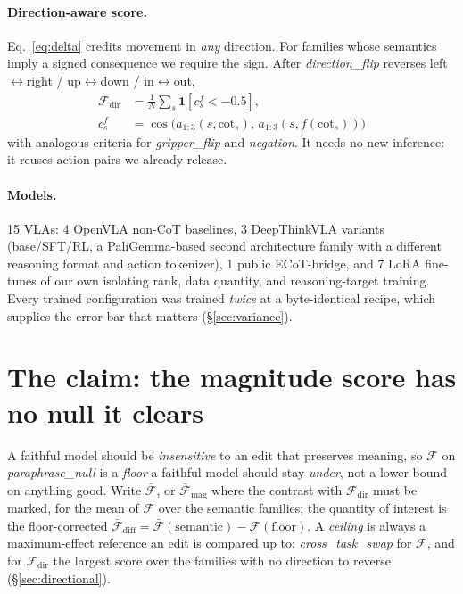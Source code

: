 \documentclass[11pt]{article}
\begin{document}
\paragraph{Direction-aware score.} Eq.~\ref{eq:delta} credits movement in \emph{any} direction. For families whose semantics imply a signed consequence we require the sign. After \emph{direction\_flip} reverses left$\leftrightarrow$right / up$\leftrightarrow$down / in$\leftrightarrow$out,
\begin{align}
\mathcal{F}_{\text{dir}} &= \tfrac{1}{N}\textstyle\sum_s \mathbf{1}\!\left[c^f_s < -0.5\right], \label{eq:fdir}\\
c^f_s &= \cos\bigl(a_{1:3}(s,\text{cot}_s),\, a_{1:3}(s,f(\text{cot}_s))\bigr) \nonumber
\end{align}
with analogous criteria for \emph{gripper\_flip} and \emph{negation}. It needs no new inference: it reuses action pairs we already release.

\paragraph{Models.} 15 VLAs: 4 OpenVLA \citep{openvla} non-CoT baselines, 3 DeepThinkVLA \citep{deepthinkvla} variants (base/SFT/RL, a PaliGemma-based \citep{paligemma} second architecture family with a different reasoning format and action tokenizer), 1 public ECoT-bridge, and 7 LoRA \citep{lora} fine-tunes of our own isolating rank, data quantity, and reasoning-target training. Every trained configuration was trained \emph{twice} at a byte-identical recipe, which supplies the error bar that matters (\S\ref{sec:variance}).

\section{The claim: the magnitude score has no null it clears}
\label{sec:floors}

A faithful model should be \emph{insensitive} to an edit that preserves meaning, so $\mathcal{F}$ on \emph{paraphrase\_null} is a \emph{floor} a faithful model should stay \emph{under}, not a lower bound on anything good. Write $\bar{\mathcal{F}}$, or $\bar{\mathcal{F}}_{\text{mag}}$ where the contrast with $\mathcal{F}_{\text{dir}}$ must be marked, for the mean of $\mathcal{F}$ over the semantic families; the quantity of interest is the floor-corrected $\bar{\mathcal{F}}_{\text{diff}} = \bar{\mathcal{F}}(\text{semantic}) - \mathcal{F}(\text{floor})$. A \emph{ceiling} is always a maximum-effect reference an edit is compared up to: \emph{cross\_task\_swap} for $\mathcal{F}$, and for $\mathcal{F}_{\text{dir}}$ the largest score over the families with no direction to reverse (\S\ref{sec:directional}).
\end{document}
